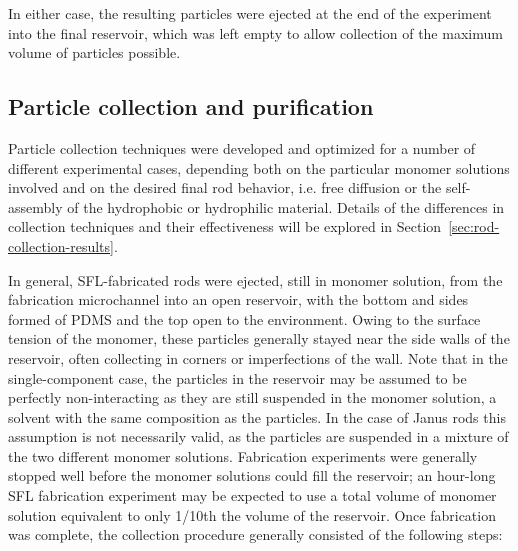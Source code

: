 In either case, the resulting particles were ejected at the end of the experiment into the final reservoir, which
was left empty to allow collection of the maximum volume of particles possible.


\begin{itemize}
\end{itemize}


\subsection{Particle collection and purification}

Particle collection techniques were developed and optimized for a number of different experimental cases,
depending both on the particular monomer solutions involved and on the desired final rod behavior, i.e. 
free diffusion or the self-assembly of the hydrophobic or hydrophilic material.  Details of the differences
in collection techniques and their effectiveness will be explored in Section~\ref{sec:rod-collection-results}.

In general, SFL-fabricated rods were ejected, still in monomer solution, from the fabrication microchannel into 
an open reservoir, with the bottom and sides formed of PDMS and the top open to the environment.  Owing to the
surface tension of the monomer, these particles generally stayed near the side walls of the reservoir, often
collecting in corners or imperfections of the wall.  Note that in the single-component case, the particles in
the reservoir may be assumed to be perfectly non-interacting as they are still suspended in the monomer solution, 
a solvent with the
same composition as the particles.   In the case of Janus rods this assumption is not necessarily valid, as
the particles are suspended in a mixture of the two different monomer solutions.  Fabrication experiments were
generally stopped well before the monomer solutions could fill the reservoir; an hour-long SFL fabrication experiment
may be expected to use a total volume of monomer solution equivalent to only 1/10th the volume of the
reservoir.  Once fabrication 
was complete, the collection procedure generally consisted of the following steps:

